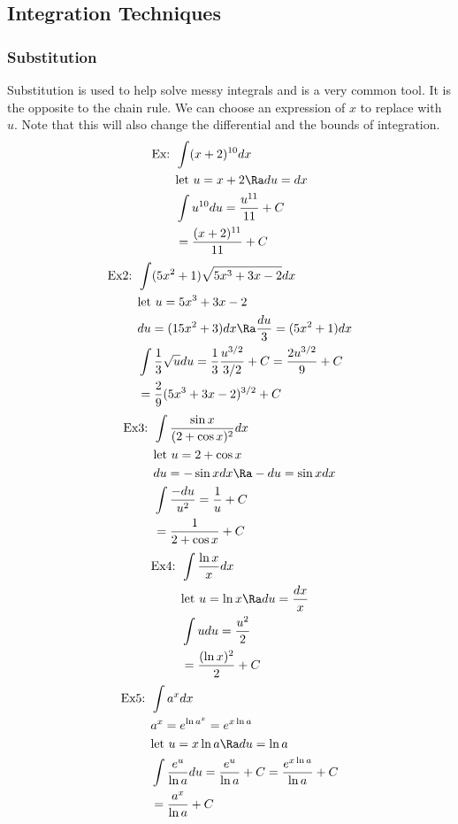 \subsection{Integration Techniques}
\subsubsection{Substitution}
Substitution is used to help solve messy integrals and is a very common tool. It is the opposite to the chain rule. We can choose an expression of $x$ to replace with $u$. Note that this will also change the differential and the bounds of integration.
\begin{align*}
    \text{Ex: }&\int (x+2)^{10}dx\\
    &\text{let }u=x+2\Ra du=dx\\
    &\int u^{10}du=\frac{u^{11}}{11}+C\\
    &=\frac{(x+2)^{11}}{11}+C
\end{align*}
\begin{align*}
    \text{Ex2: }&\int(5x^2+1)\sqrt{5x^3+3x-2}dx\\
    &\text{let }u=5x^3+3x-2\\
    &du=(15x^2+3)dx\Ra\frac{du}{3}=(5x^2+1)dx\\
    &\int \frac{1}{3}\sqrt{u}du=\frac{1}{3}\frac{u^{3/2}}{3/2}+C=\frac{2u^{3/2}}{9}+C\\
    &=\frac{2}{9}(5x^3+3x-2)^{3/2}+C
\end{align*}
\begin{align*}
    \text{Ex3: }&\int \frac{\sin x}{(2+\cos x)^2}dx\\
    &\text{let }u=2+\cos x\\
    &du=-\sin x dx\Ra-du=\sin x dx\\
    &\int\frac{-du}{u^2}=\frac{1}{u}+C\\
    &=\frac{1}{2+\cos x}+C
\end{align*}
\begin{align*}
    \text{Ex4: }&\int\frac{\ln x}{x}dx\\
    &\text{let }u=\ln x\Ra du=\frac{dx}{x}\\
    &\int udu=\frac{u^2}{2}\\
    &=\frac{(\ln x)^2}{2}+C
\end{align*}
\begin{align*}
    \text{Ex5: }&\int a^xdx\\
    &a^x=e^{\ln a^x}=e^{x\ln a}\\
    &\text{let }u=x\ln a\Ra du=\ln a\\
    &\int \frac{e^{u}}{\ln a}du=\frac{e^u}{\ln a}+C=\frac{e^{x\ln a}}{\ln a}+C\\
    &=\frac{a^x}{\ln a}+C
\end{align*}
